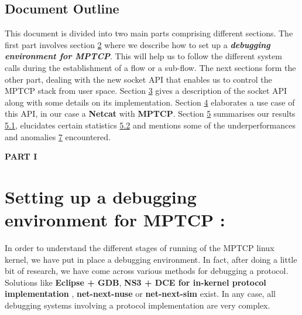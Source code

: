 \documentclass[a4paper,11pt]{article}
\begin{document}
		\clearpage
		\subsection{Document Outline}
			\begin{description}
				\item \hspace{2cm} This document is divided into two main parts comprising different sections. The first part involves section \hyperref[sec:mptcpdebug]{2} where we describe how to set up a \textbf{\emph{debugging environment for MPTCP}}. This will help us to follow the different system calls during the establishment of a flow or a sub-flow. The next sections form the other part, dealing with the new socket API that enables us to control the MPTCP stack from user space. Section \hyperref[sec:mptcpapi]{3} gives a description of the socket API along with some details on its implementation. Section \hyperref[sec:netcat-mptcp]{4} elaborates a use case of this API, in our case a \textbf{Netcat} with \textbf{MPTCP}. Section \hyperref[sec:res]{5} summarises our results \hyperref[subsec:result]{5.1}, elucidates certain statistics \hyperref[subsec:statistics]{5.2} and mentions some of the underperformances and anomalies \hyperref[sec:furtherdevelopment]{7} encountered.
			\end{description}



	\vspace*{1.5cm}

	\begin{center}
		\LARGE\textbf{PART I}
	\end{center}


	\section{Setting up a debugging environment for MPTCP : }

		\label{sec:mptcpdebug}

		In order to understand the different stages of running of the MPTCP linux kernel, we have put in place a debugging environment. In fact, after doing a little bit of research, we have come across various methods for debugging a protocol. Solutions like \textbf{Eclipse + GDB}, \textbf{NS3 + DCE for in-kernel protocol implementation} \cite[NS3+DCE]{inkernel}, \textbf{net-next-nuse} \cite[net-next-nuse]{net-next-nuse} or \textbf{net-next-sim} \cite[net-next-sim]{net-next-sim} exist. In any case, all debugging systems involving a protocol implementation are very complex. \\
\end{document}
